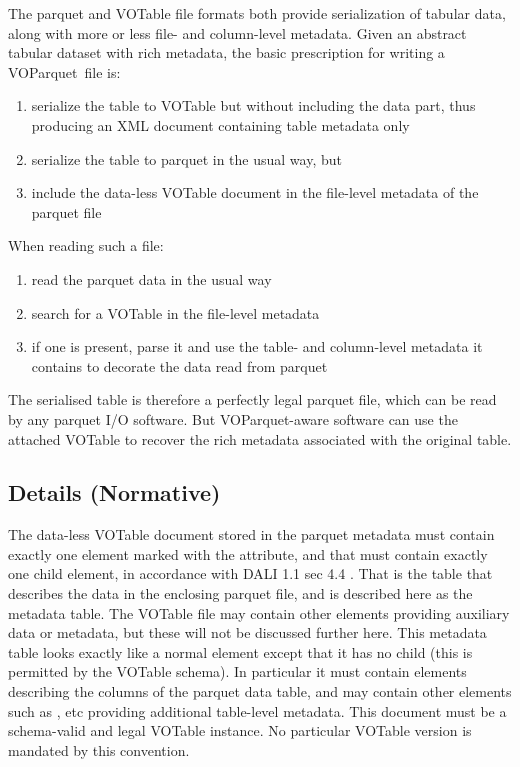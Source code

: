 \documentclass[11pt,a4paper]{ivoa}
\newcommand{\voparquet}{VOParquet}
\begin{document}
The parquet and VOTable file formats both provide serialization
of tabular data, along with more or less file- and column-level metadata.
Given an abstract tabular dataset with rich metadata,
the basic prescription for writing a \voparquet\ file is:
\begin{enumerate}
\item serialize the table to VOTable but without including the data part,
      thus producing an XML document containing table metadata only
\item serialize the table to parquet in the usual way, but
\item include the data-less VOTable document in the file-level metadata
      of the parquet file
\end{enumerate}
When reading such a file:
\begin{enumerate}
\item read the parquet data in the usual way
\item search for a VOTable in the file-level metadata
\item if one is present, parse it and use the table- and column-level
      metadata it contains to decorate the data read from parquet
\end{enumerate}

The serialised table is therefore a perfectly legal parquet file,
which can be read by any parquet I/O software.
But \voparquet-aware software can use the attached VOTable to recover
the rich metadata associated with the original table.

\subsection{Details (Normative)}
\label{sec:details}

The data-less VOTable document stored in the parquet metadata
must contain exactly one  element marked with the
 attribute,
and that  must contain
exactly one  child element,
in accordance with DALI 1.1 sec 4.4 \citep{2017ivoa.spec.0517D}.
That  is the table that describes the data in the
enclosing parquet file, and is described here as the metadata table.
The VOTable file may contain other  elements
providing auxiliary data or metadata,
but these will not be discussed further here.
This metadata table looks exactly like a normal  element
except that it has no  child
(this is permitted by the VOTable schema).
In particular it must contain  elements describing the
columns of the parquet data table,
and may contain other elements such as ,  etc
providing additional table-level metadata.
This document must be a schema-valid and legal VOTable instance.
No particular VOTable version is mandated by this convention.
\end{document}
